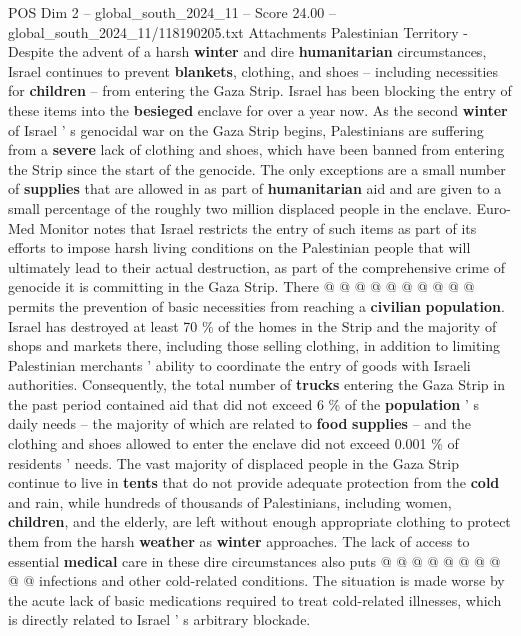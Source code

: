 \begin{textsample}{POS Dim 2 – global\_south\_2024\_11 – Score 24.00 – global\_south\_2024\_11/118190205.txt}  \label{ex:f2_pos_249}
Attachments Palestinian Territory - Despite the advent of a harsh \textbf{winter} and dire \textbf{humanitarian} circumstances, Israel continues to prevent \textbf{blankets}, clothing, and shoes -- including necessities for \textbf{children} -- from entering the Gaza Strip.
Israel has been blocking the entry of these items into the \textbf{besieged} enclave for over a year now.
As the second \textbf{winter} of Israel ' s genocidal war on the Gaza Strip begins, Palestinians are suffering from a \textbf{severe} lack of clothing and shoes, which have been banned from entering the Strip since the start of the genocide.
The only exceptions are a small number of \textbf{supplies} that are allowed in as part of \textbf{humanitarian} aid and are given to a small percentage of the roughly two million displaced people in the enclave.
Euro-Med Monitor notes that Israel restricts the entry of such items as part of its efforts to impose harsh living conditions on the Palestinian people that will ultimately lead to their actual destruction, as part of the comprehensive crime of genocide it is committing in the Gaza Strip.
There @ @ @ @ @ @ @ @ @ @ permits the prevention of basic necessities from reaching a \textbf{civilian} \textbf{population}.
Israel has destroyed at least 70 \% of the homes in the Strip and the majority of shops and markets there, including those selling clothing, in addition to limiting Palestinian merchants ' ability to coordinate the entry of goods with Israeli authorities.
Consequently, the total number of \textbf{trucks} entering the Gaza Strip in the past period contained aid that did not exceed 6 \% of the \textbf{population} ' s daily needs -- the majority of which are related to \textbf{food} \textbf{supplies} -- and the clothing and shoes allowed to enter the enclave did not exceed 0.001 \% of residents ' needs.
The vast majority of displaced people in the Gaza Strip continue to live in \textbf{tents} that do not provide adequate protection from the \textbf{cold} and rain, while hundreds of thousands of Palestinians, including women, \textbf{children}, and the elderly, are left without enough appropriate clothing to protect them from the harsh \textbf{weather} as \textbf{winter} approaches.
The lack of access to essential \textbf{medical} care in these dire circumstances also puts @ @ @ @ @ @ @ @ @ @ infections and other cold-related conditions.
The situation is made worse by the acute lack of basic medications required to treat cold-related illnesses, which is directly related to Israel ' s arbitrary blockade.

\end{textsample}
